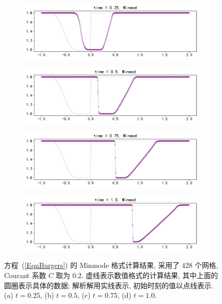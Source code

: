 \documentclass[10.5pt
]{article}
\begin{document}
\begin{figure} 
\centering
\begin{subfigure}{.9\linewidth}
  \includegraphics[width=\textwidth]{figures/problem2_limiter20.25.pdf} %
	\caption{}
  \label{fig:problem2-1}
\end{subfigure}
\begin{subfigure}{.9\linewidth}
  \includegraphics[width=\textwidth]{figures/problem2_limiter20.5.pdf} %
	\caption{}
  \label{fig:problem2-2}
\end{subfigure}
\begin{subfigure}{.9\linewidth}
  \includegraphics[width=\textwidth]{figures/problem2_limiter20.75.pdf} %
	\caption{}
  \label{fig:problem2-3}
\end{subfigure}
\begin{subfigure}{.9\linewidth}
  \includegraphics[width=\textwidth]{figures/problem2_limiter21.0.pdf} %
	\caption{}
  \label{fig:problem2-4}
\end{subfigure}
\caption{%
  方程~(\ref{EqnBurgers}) 的 Minmode 格式计算结果, 采用了 428 个网格, Courant 系数 $C$ 取为 0.2. 虚线表示数值格式的计算结果, 其中上面的圆圈表示具体的数据;
  解析解用实线表示, 初始时刻的值以点线表示. (a) $t=0.25$, (b) $t=0.5$, (c) $t=0.75$, (d) $t=1.0$.
}
  \label{fig:problem2}%
\end{figure}
\end{document}

